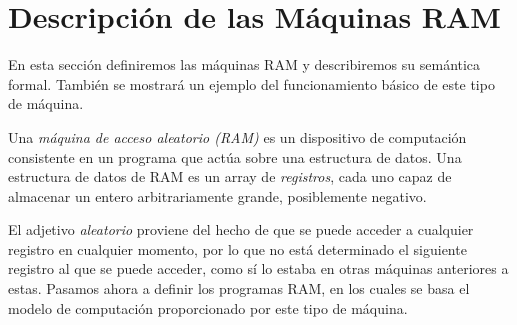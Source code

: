 \documentclass[twoside]{article}
\begin{document}
\tableofcontents

\newpage

\section{Descripción de las Máquinas RAM}

En esta sección definiremos las máquinas RAM y describiremos su semántica formal. También se mostrará un ejemplo del funcionamiento básico de este tipo de máquina.

\begin{defi}
Una \emph{máquina de acceso aleatorio (RAM)} es un dispositivo de computación consistente en un programa que actúa sobre una estructura de datos. Una estructura de datos de RAM es un array de \emph{registros}, cada uno capaz de almacenar un entero arbitrariamente grande, posiblemente negativo.
\end{defi}

El adjetivo \emph{aleatorio} proviene del hecho de que se puede acceder a cualquier registro en cualquier momento, por lo que no está determinado el siguiente registro al que se puede acceder, como sí lo estaba en otras máquinas anteriores a estas. Pasamos ahora a definir los programas RAM, en los cuales se basa el modelo de computación proporcionado por este tipo de máquina.
\end{document}
